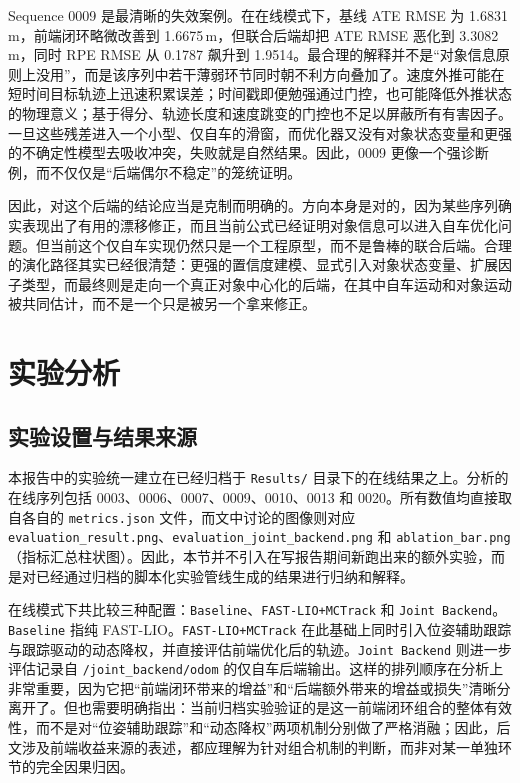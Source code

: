 \documentclass[utf8, a4paper, 12pt]{ctexart}
\begin{document}
Sequence 0009 是最清晰的失效案例。在在线模式下，基线 ATE RMSE 为 1.6831\,m，前端闭环略微改善到 1.6675\,m，但联合后端却把 ATE RMSE 恶化到 3.3082\,m，同时 RPE RMSE 从 0.1787 飙升到 1.9514。最合理的解释并不是“对象信息原则上没用”，而是该序列中若干薄弱环节同时朝不利方向叠加了。速度外推可能在短时间目标轨迹上迅速积累误差；时间戳即便勉强通过门控，也可能降低外推状态的物理意义；基于得分、轨迹长度和速度跳变的门控也不足以屏蔽所有有害因子。一旦这些残差进入一个小型、仅自车的滑窗，而优化器又没有对象状态变量和更强的不确定性模型去吸收冲突，失败就是自然结果。因此，0009 更像一个强诊断例，而不仅仅是“后端偶尔不稳定”的笼统证明。

因此，对这个后端的结论应当是克制而明确的。方向本身是对的，因为某些序列确实表现出了有用的漂移修正，而且当前公式已经证明对象信息可以进入自车优化问题。但当前这个仅自车实现仍然只是一个工程原型，而不是鲁棒的联合后端。合理的演化路径其实已经很清楚：更强的置信度建模、显式引入对象状态变量、扩展因子类型，而最终则是走向一个真正对象中心化的后端，在其中自车运动和对象运动被共同估计，而不是一个只是被另一个拿来修正。

\section{实验分析}
\subsection{实验设置与结果来源}
本报告中的实验统一建立在已经归档于 \texttt{Results/} 目录下的在线结果之上。分析的在线序列包括 0003、0006、0007、0009、0010、0013 和 0020。所有数值均直接取自各自的 \texttt{metrics.json} 文件，而文中讨论的图像则对应 \texttt{evaluation\_result.png}、\texttt{evaluation\_joint\_backend.png} 和 \texttt{ablation\_bar.png}（指标汇总柱状图）。因此，本节并不引入在写报告期间新跑出来的额外实验，而是对已经通过归档的脚本化实验管线生成的结果进行归纳和解释。

在线模式下共比较三种配置：\texttt{Baseline}、\texttt{FAST-LIO+MCTrack} 和 \texttt{Joint Backend}。\texttt{Baseline} 指纯 FAST-LIO。\texttt{FAST-LIO+MCTrack} 在此基础上同时引入位姿辅助跟踪与跟踪驱动的动态降权，并直接评估前端优化后的轨迹。\texttt{Joint Backend} 则进一步评估记录自 \texttt{/joint\_backend/odom} 的仅自车后端输出。这样的排列顺序在分析上非常重要，因为它把“前端闭环带来的增益”和“后端额外带来的增益或损失”清晰分离开了。但也需要明确指出：当前归档实验验证的是这一前端闭环组合的整体有效性，而不是对“位姿辅助跟踪”和“动态降权”两项机制分别做了严格消融；因此，后文涉及前端收益来源的表述，都应理解为针对组合机制的判断，而非对某一单独环节的完全因果归因。
\end{document}
